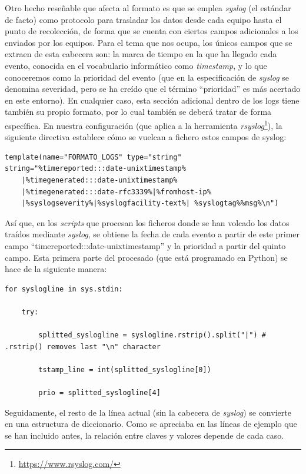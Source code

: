 Otro hecho reseñable que afecta al formato es que se emplea \emph{syslog} \cite{RFC5424} (el estándar de facto)
como protocolo para trasladar los datos desde cada equipo hasta el punto de recolección,
de forma que se cuenta con ciertos campos adicionales a los enviados por los equipos.
Para el tema que nos ocupa, los únicos campos que se extraen de esta cabecera son:
la marca de tiempo en la que ha llegado cada evento, conocida en el vocabulario informático como \emph{timestamp}, y lo que conoceremos como la prioridad del evento
(que en la especificación de \emph{syslog} se denomina severidad, pero se ha creído que el término ``prioridad'' es más acertado en este entorno).
En cualquier caso, esta sección adicional dentro de los logs tiene también su propio formato, por lo cual también se deberá tratar de forma específica.
En nuestra configuración (que aplica a la herramienta \emph{rsyslog}\footnote{\url{https://www.rsyslog.com/}}),
la siguiente directiva establece cómo se vuelcan a fichero estos campos de syslog:

\begin{verbatim}
template(name="FORMATO_LOGS" type="string"
string="%timereported:::date-unixtimestamp%
    |%timegenerated:::date-unixtimestamp%
    |%timegenerated:::date-rfc3339%|%fromhost-ip%
    |%syslogseverity%|%syslogfacility-text%| %syslogtag%%msg%\n")
\end{verbatim}

Así que, en los \emph{scripts} que procesan los ficheros donde se han volcado los datos traídos mediante \emph{syslog},
se obtiene la fecha de cada evento a partir de este primer campo ``timereported:::date-unixtimestamp'' y la prioridad a partir del quinto campo.
Esta primera parte del procesado (que está programado en Python) se hace de la siguiente manera:

\begin{verbatim}
for syslogline in sys.stdin:

    try:

        splitted_syslogline = syslogline.rstrip().split("|") # .rstrip() removes last "\n" character

        tstamp_line = int(splitted_syslogline[0])

        prio = splitted_syslogline[4]
\end{verbatim}

Seguidamente, el resto de la línea actual (sin la cabecera de \emph{syslog}) se convierte en una estructura de diccionario.
Como se apreciaba en las líneas de ejemplo que se han incluido antes, la relación entre claves y valores depende de cada caso.

